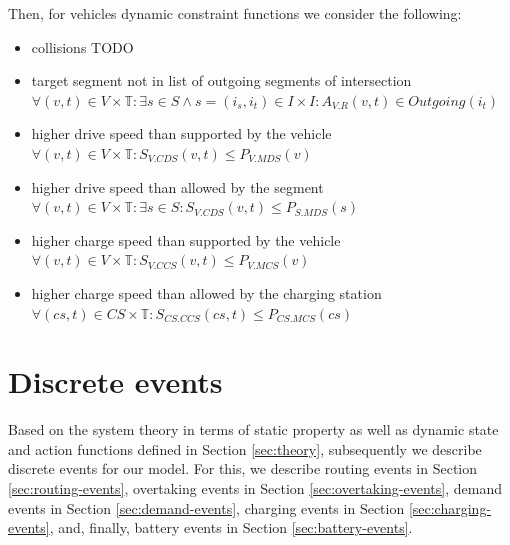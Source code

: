 \documentclass[graybox]{svmult}
\begin{document}
Then, for vehicles dynamic constraint functions we consider the following:
\begin{itemize}
	\item collisions TODO
	\item target segment not in list of outgoing segments of intersection $\forall (v,t) \in V \times \mathbb{T}: \exists s \in S \wedge s = (i_s, i_t) \in I \times I: A_{V.R}(v, t) \in Outgoing(i_t)$
	
	\item higher drive speed than supported by the vehicle $\forall (v,t) \in V \times \mathbb{T}: S_{V.CDS}(v,t) \leq P_{V.MDS}(v)$
	\item higher drive speed than allowed by the segment $\forall (v,t) \in V \times \mathbb{T}: \exists s \in S: S_{V.CDS}(v,t) \leq P_{S.MDS}(s)$
	\item higher charge speed than supported by the vehicle $\forall (v,t) \in V \times \mathbb{T}: S_{V.CCS}(v,t) \leq P_{V.MCS}(v)$
	\item higher charge speed than allowed by the charging station $\forall (cs,t) \in CS \times \mathbb{T}: S_{CS.CCS}(cs,t) \leq P_{CS.MCS}(cs)$
\end{itemize}
\vspace{-2mm}

\section{Discrete events}
\label{sec:events}
Based on the system theory in terms of static property as well as dynamic state and action functions defined in Section \ref{sec:theory}, subsequently we describe discrete events for our model. For this, we describe routing events in Section \ref{sec:routing-events}, overtaking events in Section \ref{sec:overtaking-events}, demand events in Section \ref{sec:demand-events}, charging events in Section \ref{sec:charging-events}, and, finally, battery events in Section \ref{sec:battery-events}.
\vspace{-2mm}
\end{document}
